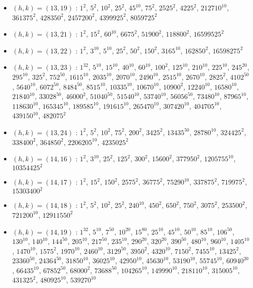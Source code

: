 \begin{itemize}
\item $(h,k)=(13,19)$ : $1^{2}$, $5^{2}$, $10^{2}$, $25^{2}$, $45^{10}$, $75^{2}$, $2525^{2}$, $4225^{2}$, $212710^{10}$, $361375^{2}$, $428350^{2}$, $2457200^{2}$, $4399925^{2}$, $8059725^{2}$
\item $(h,k)=(13,21)$ : $1^{2}$, $15^{2}$, $60^{10}$, $6675^{2}$, $51900^{2}$, $118800^{2}$, $16599525^{2}$
\item $(h,k)=(13,22)$ : $1^{2}$, $3^{10}$, $5^{10}$, $25^{2}$, $50^{2}$, $150^{2}$, $3165^{10}$, $162850^{2}$, $16598275^{2}$
\item $(h,k)=(13,23)$ : $1^{32}$, $5^{10}$, $15^{10}$, $40^{10}$, $60^{10}$, $100^{2}$, $125^{10}$, $210^{10}$, $225^{10}$, $245^{20}$, $295^{10}$, $325^{2}$, $752^{50}$, $1615^{10}$, $2035^{10}$, $2070^{10}$, $2490^{10}$, $2515^{10}$, $2670^{10}$, $2825^{2}$, $4102^{50}$, $5640^{10}$, $6072^{50}$, $8484^{50}$, $8515^{10}$, $10335^{10}$, $10670^{10}$, $10900^{2}$, $12240^{10}$, $16580^{10}$, $21840^{10}$, $33028^{50}$, $46000^{2}$, $51040^{50}$, $51540^{10}$, $53740^{10}$, $56056^{50}$, $73480^{10}$, $87965^{10}$, $118630^{10}$, $165345^{10}$, $189585^{10}$, $191615^{10}$, $265470^{10}$, $307420^{10}$, $404705^{10}$, $439150^{10}$, $482075^{2}$
\item $(h,k)=(13,24)$ : $1^{2}$, $5^{2}$, $10^{2}$, $75^{2}$, $200^{2}$, $3425^{2}$, $13435^{50}$, $28780^{10}$, $324425^{2}$, $338400^{2}$, $364850^{2}$, $2206205^{10}$, $4235025^{2}$
\item $(h,k)=(14,16)$ : $1^{2}$, $3^{10}$, $25^{2}$, $125^{2}$, $300^{2}$, $15600^{2}$, $377950^{2}$, $1205755^{10}$, $10354425^{2}$
\item $(h,k)=(14,17)$ : $1^{2}$, $15^{2}$, $150^{2}$, $2575^{2}$, $36775^{2}$, $75290^{10}$, $337875^{2}$, $719975^{2}$, $15303400^{2}$
\item $(h,k)=(14,18)$ : $1^{2}$, $5^{2}$, $10^{2}$, $25^{2}$, $240^{10}$, $450^{2}$, $650^{2}$, $750^{2}$, $3075^{2}$, $253500^{2}$, $721200^{10}$, $12911550^{2}$
\item $(h,k)=(14,19)$ : $1^{32}$, $5^{10}$, $7^{50}$, $10^{20}$, $15^{80}$, $25^{10}$, $45^{10}$, $50^{10}$, $85^{10}$, $106^{50}$, $130^{10}$, $140^{10}$, $144^{50}$, $205^{10}$, $217^{50}$, $235^{10}$, $290^{20}$, $320^{20}$, $390^{50}$, $480^{10}$, $960^{10}$, $1405^{10}$, $1470^{10}$, $1575^{2}$, $1970^{10}$, $2460^{10}$, $3129^{50}$, $3950^{2}$, $4320^{10}$, $7150^{2}$, $7455^{10}$, $13425^{2}$, $23360^{50}$, $24364^{50}$, $31850^{10}$, $36025^{10}$, $42950^{10}$, $45630^{10}$, $53190^{10}$, $55745^{10}$, $60940^{20}$, $66435^{10}$, $67852^{50}$, $68000^{2}$, $73688^{50}$, $104265^{10}$, $149990^{10}$, $218110^{10}$, $315005^{10}$, $431325^{2}$, $480925^{10}$, $539270^{10}$

\end{itemize}
